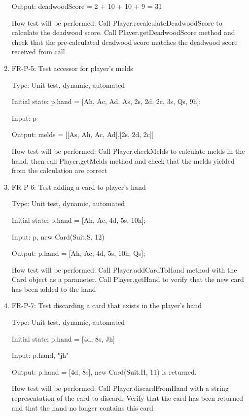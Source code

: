 \documentclass[12pt, titlepage]{article}
\begin{document}
\begin{enumerate}
    Output: deadwoodScore = 2 + 10 + 10 + 9 = 31
    
    How test will be performed: Call Player.recalculateDeadwoodScore to calculate the deadwood score. Call Player.getDeadwoodScore method and check that the pre-calculated deadwood score matches the deadwood score received from call
    
    \item{FR-P-5: Test accessor for player's melds\\}
    
    Type: Unit test, dynamic, automated
    					
    Initial state: p.hand = [Ah, Ac, Ad, As, 2s, 2d, 2c, 3s, Qs, 9h];
    
    Input: p
    
    Output: melds = [[As, Ah, Ac, Ad],[2s, 2d, 2c]]
    
    How test will be performed: Call Player.checkMelds to calculate melds in the hand, then call Player.getMelds method and check that the melds yielded from the calculation are correct
    
    \item{FR-P-6: Test adding a card to player's hand\\}
    
    Type: Unit test, dynamic, automated
    					
    Initial state: p.hand = [Ah, Ac, 4d, 5s, 10h];
    
    Input: p, new Card(Suit.S, 12)
    
    Output: p.hand = [Ah, Ac, 4d, 5s, 10h, Qs];
    
    How test will be performed: Call Player.addCardToHand method with the Card object as a parameter. Call Player.getHand to verify that the new card has been added to the hand
    
    \item{FR-P-7: Test discarding a card that exists in the player's hand\\}
    
    Type: Unit test, dynamic, automated
    					
    Initial state: p.hand = [4d, 8s, Jh]
    
    Input: p.hand, "jh"
    
    Output: p.hand = [4d, 8s], new Card(Suit.H, 11) is returned.
    
    How test will be performed: Call Player.discardFromHand with a string representation of the card to discard. Verify that the card has been returned and that the hand no longer contains this card
    

\end{enumerate}
\end{document}
